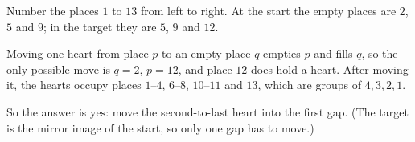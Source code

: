Number the places $1$ to $13$ from left to right. At the start the empty places are $2$, $5$ and $9$; in the target they are $5$, $9$ and $12$.

Moving one heart from place $p$ to an empty place $q$ empties $p$ and fills $q$, so the only possible move is $q=2$, $p=12$, and place $12$ does hold a heart. After moving it, the hearts occupy places $1$--$4$, $6$--$8$, $10$--$11$ and $13$, which are groups of $4,3,2,1$.

So the answer is $\boxed{\text{yes}}$: move the second-to-last heart into the first gap. (The target is the mirror image of the start, so only one gap has to move.)
